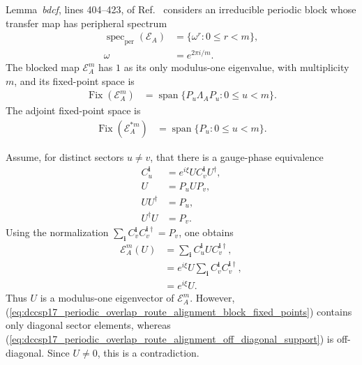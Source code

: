 \documentclass{article}
\begin{document}
Lemma~\emph{bdcf}, lines 404--423, of
Ref.~\cite{DeLasCuevas2017Irreducible} considers an irreducible periodic block
whose transfer map has peripheral spectrum
\begin{align}
    \operatorname{spec}_{\mathrm{per}}(\mathcal E_A)
    &=\{\omega^r:0\leq r<m\},
    \label{eq:dccsp17_periodic_overlap_route_alignment_block_peripheral_spectrum}\\
    \omega
    &=e^{2\pi i/m}.
    \label{eq:dccsp17_periodic_overlap_route_alignment_primitive_root}
\end{align}
The blocked map $\mathcal E_A^m$ has $1$ as its only modulus-one eigenvalue,
with multiplicity $m$, and its fixed-point space is
\begin{align}
    \operatorname{Fix}(\mathcal E_A^m)
    &=\operatorname{span}
      \{P_u\Lambda_AP_u:0\leq u<m\}.
    \label{eq:dccsp17_periodic_overlap_route_alignment_block_fixed_points}
\end{align}
The adjoint fixed-point space is
\begin{align}
    \operatorname{Fix}(\mathcal E_A^{*m})
    &=\operatorname{span}
      \{P_u:0\leq u<m\}.
    \label{eq:dccsp17_periodic_overlap_route_alignment_adjoint_fixed_points}
\end{align}

Assume, for distinct sectors $u\neq v$, that there is a gauge-phase
equivalence
\begin{align}
    C_u^{\mathbf i}
    &=e^{i\xi}UC_v^{\mathbf i}U^\dagger,
    \label{eq:dccsp17_periodic_overlap_route_alignment_sector_gauge_phase}\\
    U
    &=P_uUP_v,
    \label{eq:dccsp17_periodic_overlap_route_alignment_off_diagonal_support}\\
    UU^\dagger
    &=P_u,
    \label{eq:dccsp17_periodic_overlap_route_alignment_left_support_isometry}\\
    U^\dagger U
    &=P_v.
    \label{eq:dccsp17_periodic_overlap_route_alignment_right_support_isometry}
\end{align}
Using the normalization
$\sum_{\mathbf i}C_v^{\mathbf i}C_v^{\mathbf i\dagger}=P_v$, one obtains
\begin{align}
    \mathcal E_A^m(U)
    &=\sum_{\mathbf i}
      C_u^{\mathbf i}U C_v^{\mathbf i\dagger},
    \label{eq:dccsp17_periodic_overlap_route_alignment_off_diagonal_transfer}\\
    &=e^{i\xi}U
      \sum_{\mathbf i}
      C_v^{\mathbf i}C_v^{\mathbf i\dagger},
    \label{eq:dccsp17_periodic_overlap_route_alignment_insert_sector_gauge}\\
    &=e^{i\xi}U.
    \label{eq:dccsp17_periodic_overlap_route_alignment_off_diagonal_eigenvector}
\end{align}
Thus $U$ is a modulus-one eigenvector of $\mathcal E_A^m$. However,
(\ref{eq:dccsp17_periodic_overlap_route_alignment_block_fixed_points}) contains
only diagonal sector elements, whereas
(\ref{eq:dccsp17_periodic_overlap_route_alignment_off_diagonal_support}) is
off-diagonal. Since $U\neq 0$, this is a contradiction.
\end{document}
